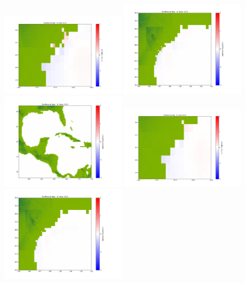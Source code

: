 \documentclass[11pt]{article}
\begin{document}
\vskip 10pt 
\includegraphics[width=0.475\textwidth]{frame0030fig1001.png}
\includegraphics[width=0.475\textwidth]{frame0030fig1002.png}
\vskip 10pt 
\includegraphics[width=0.475\textwidth]{frame0030fig1003.png}
\vskip 10pt 
\includegraphics[width=0.475\textwidth]{frame0031fig1001.png}
\includegraphics[width=0.475\textwidth]{frame0031fig1002.png}
\end{document}
